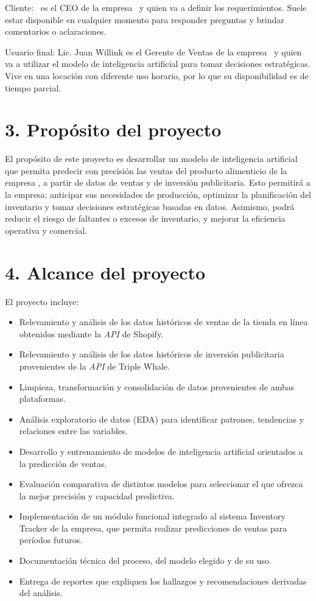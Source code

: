 \documentclass[
11pt, %
]{charter}
\begin{document}
Cliente: \clientename\ es el CEO de la empresa \empclientename\ y quien va a definir los requerimientos. Suele estar disponible en cualquier momento para responder preguntas  y brindar comentarios o aclaraciones.

Usuario final: Lic. Juan Willink es el Gerente de Ventas de la empresa \empclientename\ y quien va a utilizar el modelo de inteligencia artificial para tomar decisiones estratégicas. 
Vive en una locación con diferente uso horario, por lo que su disponibilidad es de tiempo parcial.


\section{3. Propósito del proyecto}
\label{sec:proposito}

El propósito de este proyecto es desarrollar un modelo de inteligencia artificial que permita predecir con precisión las ventas del producto alimenticio de la empresa \empclientename, 
a partir de datos de ventas y de inversión publicitaria. 
Esto permitirá a la empresa: anticipar sus necesidades de producción, optimizar la planificación del inventario y tomar decisiones estratégicas basadas en datos. 
Asimismo, podrá reducir el riesgo de faltantes o excesos de inventario, y mejorar la eficiencia operativa y comercial.

\section{4. Alcance del proyecto}
\label{sec:alcance}

El proyecto incluye:
\begin{itemize}
\item Relevamiento y análisis de los datos históricos de ventas de la tienda en línea obtenidos mediante la \textit{API} de Shopify.
\item Relevamiento y análisis de los datos históricos de inversión publicitaria provenientes de la \textit{API} de Triple Whale.
\item Limpieza, transformación y consolidación de datos provenientes de ambas plataformas.
\item Análisis exploratorio de datos (EDA) para identificar patrones, tendencias y relaciones entre las variables.
\item Desarrollo y entrenamiento de modelos de inteligencia artificial orientados a la predicción de ventas.
\item Evaluación comparativa de distintos modelos para seleccionar el que ofrezca la mejor precisión y capacidad predictiva.
\item Implementación de un módulo funcional integrado al sistema Inventory Tracker de la empresa, que permita realizar predicciones de ventas para períodos futuros.
\item Documentación técnica del proceso, del modelo elegido y de su uso.
\item Entrega de reportes que expliquen los hallazgos y recomendaciones derivadas del análisis.
\end{itemize}
\end{document}
